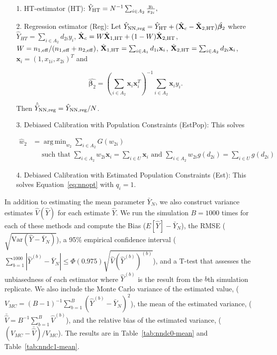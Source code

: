 \documentclass[12pt]{article}
\DeclareMathOperator*{\argmin}{arg\,min}
\newcommand{\Var}{{\text{Var}}}
\renewcommand{\bf}[1]{\mathbf{#1}}
\begin{document}
\begin{itemize}
  \item[1.] HT-estimator (HT): $\hat Y_{\rm HT} = N^{-1} \sum_{i \in A_2}
    \frac{y_i}{\pi_{2i}},$
  \item[2.] Regression estimator (Reg): Let $\hat Y_{\rm NN, reg} = \hat Y_{\rm HT} + (
  \hat{\bf X}_c - \hat{\bf X}_{2, \rm HT}) \hat{\bm \beta_2}$ where $\hat Y_{HT} =
\sum_{i \in A_2} d_{2i} y_i$, $\hat{\bf X}_c = W \hat{\bf X}_{1, \rm HT} + (1 -
W)\hat{\bf X}_{2, \rm HT}$, $W = n_{1,\rm{eff}} / (n_{1,\rm{eff}} + n_{2, \rm{eff}})$,
$\hat{\bf X}_{1, \rm HT} = \sum_{i \in A_1} d_{1i} \bf x_{i}$, $\hat{\bf X}_{2,
    \rm HT} = \sum_{i \in A_2} d_{2i} \bf x_{i}$, $\bf x_i = (1, x_{1i}, x_{2i})^T$
    and 

    $$ \hat{\bm \beta_2} = \left(\sum_{i \in A_2} \bf x_i \bf x_i^T\right)^{-1}
    \sum_{i \in A_2} \bf x_i y_i.$$

    Then $\hat{\bar Y}_{\rm NN, reg} = \hat Y_{\rm NN, reg} / N$.
  \item[3.] Debiased Calibration with Population Constraints (EstPop): This 
    solves 

  \begin{align*}
    \hat w_2 &= \argmin_{w_2} \sum_{i \in A_2} G(w_{2i}) \\
    &\quad\text{ such that } 
  \sum_{i \in A_2} w_{2i} \bf x_i = \sum_{i \in U} \bf x_i \text{ and } 
  \sum_{i \in A_2} w_{2i} g(d_{2i}) = \sum_{i \in U} g(d_{2i})
  \end{align*}

  \item[4.] Debiased Calibration with Estimated Population Constraints (Est):
    This solves Equation~\eqref{eq:nnopt} with $q_i = 1$.
\end{itemize}

In addition to estimating the mean parameter $\bar Y_N$, we also construct
variance estimates $\hat V(\hat Y)$ for each estimate $\hat Y$.
We run the simulation $B = 1000$ times for each of these methods and compute the
Bias ($E[\hat Y] - \bar Y_N$), the RMSE ($\sqrt{\Var(\hat Y - \bar Y_N)}$), a 95\%
empirical confidence interval ($\sum_{b = 1}^{1000} |\hat Y^{(b)} - \bar Y_N| \leq 
\Phi(0.975)\sqrt{\hat V(\hat Y^{(b)})^{(b)}}$), and a T-test that assesses the
unbiasedness of each estimator where $\hat Y^{(b)}$ is the result from the $b$th
simulation replicate. We also include the Monte Carlo variance of the estimated
value, ($V_{MC} = (B - 1)^{-1} \sum_{b = 1}^B (\hat Y^{(b)} - \bar Y_N)^2$), the
mean of the estimated variance, 
($\bar{\hat V} = B^{-1} \sum_{b = 1}^B \hat V^{(b)}$), and the relative bias of
the estimated variance, ($(V_{MC} - \bar{\hat V}) / V_{MC}$). The results are in
Table~\ref{tab:nndc0-mean} and Table~\ref{tab:nndc1-mean}.
\end{document}
